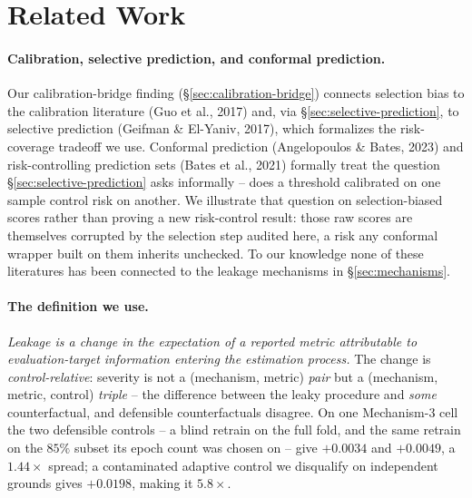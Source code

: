\documentclass{article}
\begin{document}
\section{Related Work}
\label{sec:related}

\paragraph{Calibration, selective prediction, and conformal prediction.}
Our calibration-bridge finding (\S\ref{sec:calibration-bridge}) connects
selection bias to the calibration literature (Guo et al., 2017) and, via
\S\ref{sec:selective-prediction}, to selective prediction (Geifman \&
El-Yaniv, 2017), which formalizes the risk-coverage tradeoff we use.
Conformal prediction (Angelopoulos \& Bates, 2023) and risk-controlling
prediction sets (Bates et al., 2021) formally treat the question
\S\ref{sec:selective-prediction} asks informally -- does a threshold
calibrated on one sample control risk on another. We illustrate that question
on selection-biased scores rather than proving a new risk-control result: those
raw scores are themselves corrupted by the selection step audited here, a risk
any conformal wrapper built on them inherits unchecked. To our knowledge none
of these literatures has been connected to the leakage mechanisms in
\S\ref{sec:mechanisms}.

\paragraph{The definition we use.} \emph{Leakage is a change in the
expectation of a reported metric attributable to evaluation-target
information entering the estimation process.} The change is
\emph{control-relative}: severity is not a (mechanism, metric) \emph{pair}
but a (mechanism, metric, control) \emph{triple} -- the difference between
the leaky procedure and \emph{some} counterfactual, and defensible
counterfactuals disagree. On one Mechanism-3 cell the two defensible
controls -- a blind retrain on the full fold, and the same retrain on the
$85\%$ subset its epoch count was chosen on -- give $+0.0034$ and $+0.0049$,
a $1.44\times$ spread; a contaminated adaptive control we disqualify on
independent grounds gives $+0.0198$, making it $5.8\times$.
\end{document}
